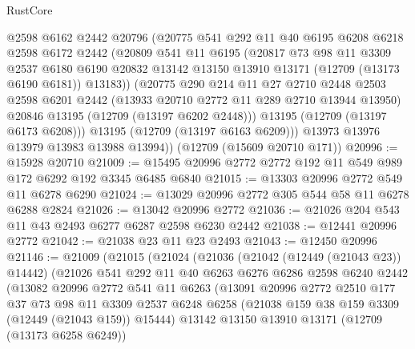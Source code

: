 \begin{lexlean}{RustCore}
\begin{coremodule}
          @2598
          @6162
          @2442
          @20796
          (@20775
            @541
            @292
            @11
            @40
            @6195
            @6208
            @6218
            @2598
            @6172
            @2442
            (@20809
              @541
              @11
              @6195
              (@20817
                @73
                @98
                @11
                @3309
                @2537
                @6180
                @6190
                @20832
                @13142
                @13150
                @13910
                @13171
                (@12709 (@13173 @6190 @6181))
                @13183))
            (@20775
              @290
              @214
              @11
              @27
              @2710
              @2448
              @2503
              @2598
              @6201
              @2442
              (@13933 @20710 @2772 @11 @289 @2710 @13944 @13950)
              @20846
              @13195
              (@12709 (@13197 @6202 @2448)))
            @13195
            (@12709 (@13197 @6173 @6208)))
          @13195
          (@12709 (@13197 @6163 @6209)))
        @13973
        @13976
        @13979
        @13983
        @13988
        @13994))
    (@12709 (@15609 @20710 @171))
@20996 := @15928 @20710
@21009 := @15495 @20996 @2772 @2772 @192 @11 @549 @989 @172 @6292 @192 @3345 @6485 @6840
@21015 := @13303 @20996 @2772 @549 @11 @6278 @6290
@21024 := @13029 @20996 @2772 @305 @544 @58 @11 @6278 @6288 @2824
@21026 := @13042 @20996 @2772
@21036 := @21026 @204 @543 @11 @43 @2493 @6277 @6287 @2598 @6230 @2442
@21038 := @12441 @20996 @2772
@21042 := @21038 @23 @11 @23 @2493
@21043 := @12450 @20996
@21146 := @21009
    (@21015
      (@21024
        (@21036
          (@21042 (@12449 (@21043 @23)) @14442)
          (@21026
            @541
            @292
            @11
            @40
            @6263
            @6276
            @6286
            @2598
            @6240
            @2442
            (@13082
              @20996
              @2772
              @541
              @11
              @6263
              (@13091
                @20996
                @2772
                @2510
                @177
                @37
                @73
                @98
                @11
                @3309
                @2537
                @6248
                @6258
                (@21038 @159 @38 @159 @3309 (@12449 (@21043 @159)) @15444)
                @13142
                @13150
                @13910
                @13171
                (@12709 (@13173 @6258 @6249))

\end{coremodule}
\end{lexlean}
